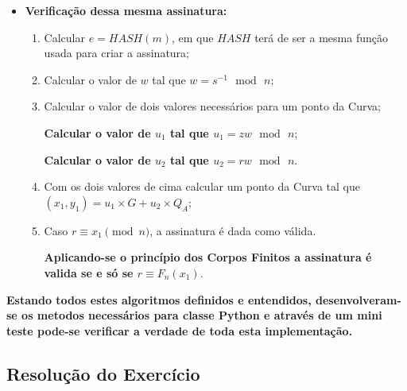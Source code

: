 \documentclass[12pt]{report}
\begin{document}
\begin{itemize}
\item
  \textbf{Verificação dessa mesma assinatura:}

  \begin{enumerate}

  \item
    Calcular \(e = HASH(m)\), em que \(HASH\) terá de ser a mesma função
    usada para criar a assinatura;

\vspace{2 mm}
  \item
    Calcular o valor de \(w\) tal que
    \({\displaystyle w=s^{-1}\,{\bmod {\,}}n}\);
\vspace{2 mm}
  \item
    Calcular o valor de dois valores necessários para um ponto da Curva;

\vspace{1 mm}
\textbf{Calcular o valor de \(u_{1}\) tal que
      \({\displaystyle u_{1}=zw\,{\bmod {\,}}n}\)};

\textbf{Calcular o valor de \(u_{2}\) tal que
      \({\displaystyle u_{2}=rw\,{\bmod {\,}}n}\)}.
\vspace{2 mm}
  \item
    Com os dois valores de cima calcular um ponto da Curva tal que
    \({\displaystyle (x_{1},y_{1})=u_{1}\times G+u_{2}\times Q_{A}}\);
\vspace{2 mm}
  \item
    Caso \({\displaystyle r\equiv x_{1}{\pmod {n}}}\), a assinatura é
    dada como válida.

\vspace{2 mm}
 \textbf{Aplicando-se o princípio dos \textbf{Corpos Finitos} a assinatura
      é valida se e só se \(r\equiv F_{n}(x_{1})\)}.

  \end{enumerate}
\end{itemize}
\vspace{2 mm}

\textbf{Estando todos estes algoritmos definidos e entendidos, desenvolveram-se
os metodos necessários para classe Python e através de um mini teste
pode-se verificar a verdade de toda esta implementação.}
\vspace{5 mm}
\subsection{Resolução do
Exercício}\label{resoluuxe7uxe3o-do-exercuxedcio}
\end{document}
